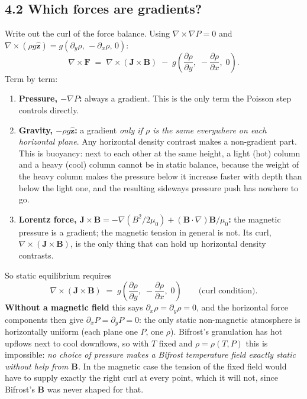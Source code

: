 \documentclass[10pt]{extarticle}
\newcommand{\B}{\mathbf B}\newcommand{\J}{\mathbf J}\newcommand{\F}{\mathbf F}\newcommand{\zh}{\hat{\mathbf z}}
\begin{document}
\subsection*{4.2 Which forces are gradients?}
Write out the curl of the force balance. Using $\nabla\times\nabla P=0$ and $\nabla\times(\rho g\zh)=g(\partial_y\rho,\,-\partial_x\rho,\,0)$:
\[
\nabla\times\F \;=\; \nabla\times(\J\times\B) \;-\; g\left(\frac{\partial\rho}{\partial y},\;-\frac{\partial\rho}{\partial x},\;0\right) .
\]
Term by term:
\begin{enumerate}
\item \textbf{Pressure, $-\nabla P$:} always a gradient. This is the only term the Poisson step controls directly.
\item \textbf{Gravity, $-\rho g\zh$:} a gradient \emph{only if $\rho$ is the same everywhere on each horizontal plane}. Any
horizontal density contrast makes a non-gradient part. This is buoyancy: next to each other at the same height, a light
(hot) column and a heavy (cool) column cannot be in static balance, because the weight of the heavy column makes the pressure
below it increase faster with depth than below the light one, and the resulting sideways pressure push has nowhere to go.
\item \textbf{Lorentz force, $\J\times\B=-\nabla\!\left(B^2/2\mu_0\right)+(\B\cdot\nabla)\B/\mu_0$:} the magnetic
pressure is a gradient; the magnetic tension in general is not. Its curl, $\nabla\times(\J\times\B)$, is the only thing that can
hold up horizontal density contrasts.
\end{enumerate}
So static equilibrium requires
\[
\nabla\times(\J\times\B) \;=\; g\left(\frac{\partial\rho}{\partial y},\;-\frac{\partial\rho}{\partial x},\;0\right)
\qquad\text{(curl condition)} .
\]
\textbf{Without a magnetic field} this says $\partial_x\rho=\partial_y\rho=0$, and the horizontal force components then give
$\partial_xP=\partial_yP=0$: the only static non-magnetic atmosphere is horizontally uniform (each plane one $P$, one $\rho$).
Bifrost's granulation has hot upflows next to cool downflows, so with $T$ fixed and $\rho=\rho(T,P)$ this is impossible:
\emph{no choice of pressure makes a Bifrost temperature field exactly static without help from $\B$.} In the magnetic
case the tension of the fixed field would have to supply exactly the right curl at every point, which it will not, since
Bifrost's $\B$ was never shaped for that.
\end{document}
